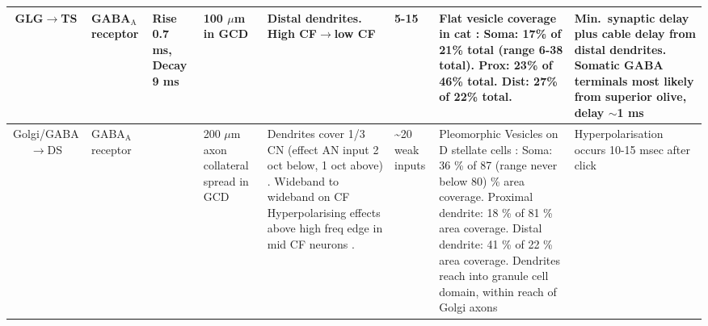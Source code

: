 \begin{longtable}{cXXXXXXX}
GLG\ensuremath{\rightarrow}TS                         
&%
GABA$_{\textrm{A}}$ receptor  \citep[bicuculine-sensitive VCN T stellate cell, mouse slice preparation][]{FerragamoGoldingEtAl:1998} \citep[Chinchilla][]{JosephsonMorest:1998}
& %
Rise 0.7 ms, Decay 9 ms  \citep[probably a combination of two decay time constants, fast 5-10 slow 20-60][]{AwatramaniTurecekEtAl:2005}                     
& %
100 $\mu$m in GCD \citep{FerragamoGoldingEtAl:1998}
& %
Distal dendrites.
High CF\ensuremath{\rightarrow}low CF \citep[Chinchilla][]{JosephsonMorest:1998}                        
& %
5-15 \citep[Estimate, cat][]{SmithRhode:1989}     
& %
Flat vesicle coverage in cat \citep[][]{SmithRhode:1989}:
Soma: 17\% of 21\% total (range 6-38 total). 
Prox: 23\% of 46\% total. 
Dist: 27\% of 22\% total. 
& %
Min.\ synaptic delay plus cable delay from distal dendrites.
Somatic GABA terminals most likely from superior olive, delay $\sim$1 ms
\\ \midrule
Golgi/GABA  \ensuremath{\rightarrow}DS                         
& %
GABA$_{\textrm{A}}$ receptor \citep{EvansZhao:1998,FerragamoGoldingEtAl:1998a,Mugnaini:1985,MugnainiOsenEtAl:1980,SaintMorestEtAl:1989}                           
& %
& %
200 $\mu$m axon collateral spread in GCD \citep{FerragamoGoldingEtAl:1998}
& %
Dendrites cover 1/3 CN (effect AN input 2 oct below, 1 oct above) \citep[guinea pig][]{PalmerJiangEtAl:1996}.
Wideband to wideband on CF \citep{EvansZhao:1998} 
Hyperpolarising effects above high freq edge in mid CF neurons \citep[rat][]{PaoliniClark:1999}.                    
& %
\~{}20 weak inputs\citep{SaintMorestEtAl:1989}                     
& %
Pleomorphic Vesicles on D stellate cells \citep[cat][]{SmithRhode:1989}:
Soma: 36 \%  of 87 (range never below 80) \% area coverage. 
Proximal dendrite: 18 \%  of 81 \% area coverage.  
Distal dendrite: 41 \%  of 22 \% area coverage.   
Dendrites reach into granule cell domain, within reach of Golgi axons \citep{OertelWuEtAl:1990,ArnottWallaceEtAl:2004}     
& %
Hyperpolarisation occurs 10-15 msec after click \citep{PaoliniClark:1999}
\\ \midrule

\end{longtable}





